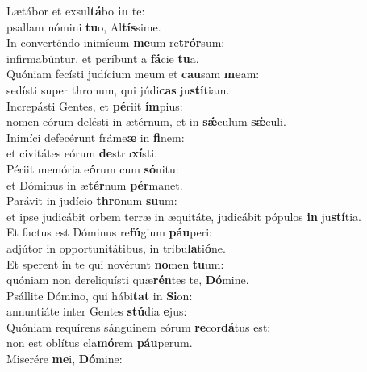\evenverse Lætábor et exsul\textbf{tá}bo \textbf{in} te:~\*\\
\evenverse psallam nómini \textbf{tu}o, Al\textbf{tís}sime.\\
\oddverse In converténdo inimícum \textbf{me}um re\textbf{trór}sum:~\*\\
\oddverse infirmabúntur, et períbunt a \textbf{fá}cie \textbf{tu}a.\\
\evenverse Quóniam fecísti judícium meum et \textbf{cau}sam \textbf{me}am:~\*\\
\evenverse sedísti super thronum, qui júdi\textbf{cas} ju\textbf{stí}tiam.\\
\oddverse Increpásti Gentes, et \textbf{pé}riit \textbf{ím}pius:~\*\\
\oddverse nomen eórum delésti in ætérnum, et in \textbf{sǽ}culum \textbf{sǽ}culi.\\
\evenverse Inimíci defecérunt fráme\textbf{æ} in \textbf{fi}nem:~\*\\
\evenverse et civitátes eórum \textbf{de}stru\textbf{xí}sti.\\
\oddverse Périit memória e\textbf{ó}rum cum \textbf{só}nitu:~\*\\
\oddverse et Dóminus in æ\textbf{tér}num \textbf{pér}manet.\\
\evenverse Parávit in judício \textbf{thro}num \textbf{su}um:~\*\\
\evenverse et ipse judicábit orbem terræ in æquitáte, judicábit pópulos \textbf{in} ju\textbf{stí}tia.\\
\oddverse Et factus est Dóminus re\textbf{fú}gium \textbf{páu}peri:~\*\\
\oddverse adjútor in opportunitátibus, in tribu\textbf{la}ti\textbf{ó}ne.\\
\evenverse Et sperent in te qui novérunt \textbf{no}men \textbf{tu}um:~\*\\
\evenverse quóniam non dereliquísti quæ\textbf{rén}tes te, \textbf{Dó}mine.\\
\oddverse Psállite Dómino, qui hábi\textbf{tat} in \textbf{Si}on:~\*\\
\oddverse annuntiáte inter Gentes \textbf{stú}dia \textbf{e}jus:\\
\evenverse Quóniam requírens sánguinem eórum \textbf{re}cor\textbf{dá}tus est:~\*\\
\evenverse non est oblítus cla\textbf{mó}rem \textbf{páu}perum.\\
\oddverse Miserére \textbf{me}i, \textbf{Dó}mine:~\*\\
